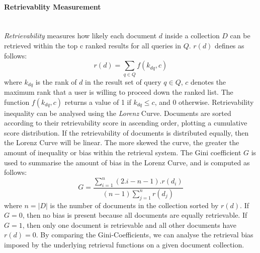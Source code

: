 \paragraph{Retrievablity Measurement}
\ \\
\textit{Retrievability} measures how likely each document $ d $ inside a collection $ D $ can be retrieved within the top c ranked results for all queries in $ Q $. $ r(d) $ defines as follows:
\[
r(d)=\sum_{q \in Q}f(k_{dq},c)
\]
where $ k_{dq} $ is the rank of $ d $ in the result set of query $ q \in Q $, $ c $ denotes the maximum rank that a user is willing to proceed down the ranked list. The function $ f(k_{dq},c) $ returns a value of 1 if $ k_{dq} \leq c $, and 0 otherwise. Retrievability inequality can be analysed using the \textit{Lorenz} Curve. Documents are sorted according to their retrievability score in ascending order, plotting a cumulative score distribution. If the retrievability of documents is distributed equally, then the Lorenz Curve will be linear. The more skewed the curve, the greater the amount of inequality or bias within the retrieval system. The Gini coefficient $ G $ is used to summarise the amount of bias in the Lorenz Curve, and is computed as follows:
\begin{equation}
G=\frac{\sum_{i=1}^n(2.i-n-1).r(d_{i})}{(n-1)\sum_{j=1}^nr(d_{j})}
\end{equation}
\noindent
where $ n=|D| $ is the number of documents in the collection sorted by $ r(d) $. If $ G=0 $, then no bias is present because all documents are equally retrievable. If $ G=1 $, then only one document is retrievable and all other documents have $ r(d)=0 $. By comparing the Gini-Coefficients, we can analyse the retrieval bias imposed by the underlying retrieval functions on a given document collection.

